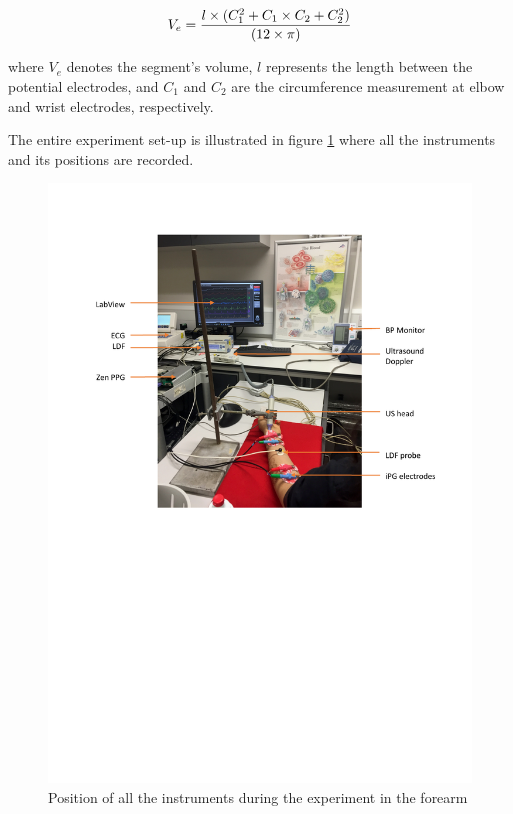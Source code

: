 \begin{align}
	\label{eq:v_e}
	V_e =\frac{l \times (C_1^2+C_1 \times C_2 + C_2^2)}{(12 \times \pi)} \tagaddtext{[\si{\cubic\centi\meter}]}
\end{align}

where $V_e$ denotes the segment's volume, $l$ represents the length between the potential electrodes, and $C_1$ and $C_2$ are the circumference measurement at elbow and wrist electrodes, respectively.

The entire experiment set-up is illustrated in figure \ref{fig:experimental set-up} where all the instruments and its positions are recorded.

\begin{figure}[!htpb]
	\centering
	\includegraphics[width=15cm,keepaspectratio]{figure1}
	\caption{Position of all the instruments during the experiment in the forearm}
	\label{fig:experimental set-up}
\end{figure}

